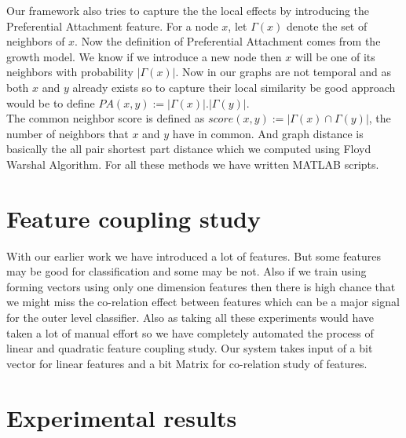 Our framework also tries to capture the the local effects by introducing the Preferential Attachment feature. For a node $x$, let $\Gamma (x)$ denote the set of neighbors of $x$. Now the definition of Preferential Attachment comes from the growth model. We know if we introduce a new node then $x$ will be one of its neighbors with probability $|\Gamma(x)|$. Now in our graphs are not temporal and as both $x$ and $y$ already exists so to capture their local similarity be good approach would be to define $PA(x,y) := |\Gamma(x)|.|\Gamma(y)|$.
\\
The common neighbor score is defined as $score(x, y) := |\Gamma(x) \cap \Gamma(y)|$, the number of neighbors that $x$ and $y$ have in common. And graph distance is basically the all pair shortest part distance which we computed using Floyd Warshal Algorithm. For all these methods we have written MATLAB scripts.

\section*{Feature coupling study}
With our earlier work we have introduced a lot of features. But some features may be good for classification and some may be not. Also if we train using forming vectors using only one dimension features then there is high chance that we might miss the co-relation effect between features which can be a major signal for the outer level classifier. Also as taking all these experiments would have taken a lot of manual effort so we have completely automated the process of linear and quadratic feature coupling study. Our system takes input of a bit vector for linear features and a bit Matrix for co-relation study of features.

\section*{Experimental results}

